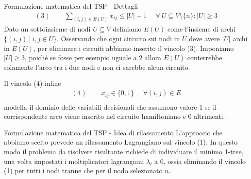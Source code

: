 \documentclass[10pt]{beamer}
\begin{document}
\begin{frame}{Formulazione matematica del TSP - Dettagli}
    \begin{equation*}
      \begin{split}
        (3) \:\:\:\:\:\: & \sum_{(i,j) \in E(U)} x_{ij} \leq |U| - 1 \:\:\:\:\:\: \forall\: U \subseteq V\setminus\{n\} : |U| \geq 3
      \end{split}
    \end{equation*}
    Dato un sottoinsieme di nodi $U \subseteq V$ definiamo $E(U)$ come l'insieme di archi $\{ (i,j) \:|\: i,j \in U \}$. Osservando che ogni circuito sui nodi in $U$ deve avere $|U|$ archi in $E(U)$, per eliminare i circuiti abbiamo inserito il vincolo (3). Imponiamo $|U| \geq 3$, poiché se fosse per esempio uguale a 2 allora $E(U)$ conterrebbe solamente l'arco tra i due nodi e non ci sarebbe alcun circuito.
    
    Il vincolo (4) infine
    \begin{equation*}
      \begin{split}
        (4) \:\:\:\:\:\: & x_{ij} \in \{0,1\} \:\:\:\:\:\: \forall (i,j) \in E\\
      \end{split}
    \end{equation*}
    modella il dominio delle variabili decisionali che assumono valore 1 se il corrispondente arco viene inserito nel circuito hamiltoniano e 0 altrimenti.
\end{frame}

\begin{frame}{Formulazione matematica del TSP - Idea di rilassamento}
    L'approccio che abbiamo scelto prevede un rilassamento Lagrangiano sul vincolo (1).\newline
    In questo modo il problema da risolvere risultante richiede di individuare il minimo 1-tree, una volta impostati i moltiplicatori lagrangiani $\lambda_i$ a 0, ossia eliminando il vincolo (1) per tutti i nodi tranne che per il nodo selezionato $n$.
\end{frame}
\end{document}
